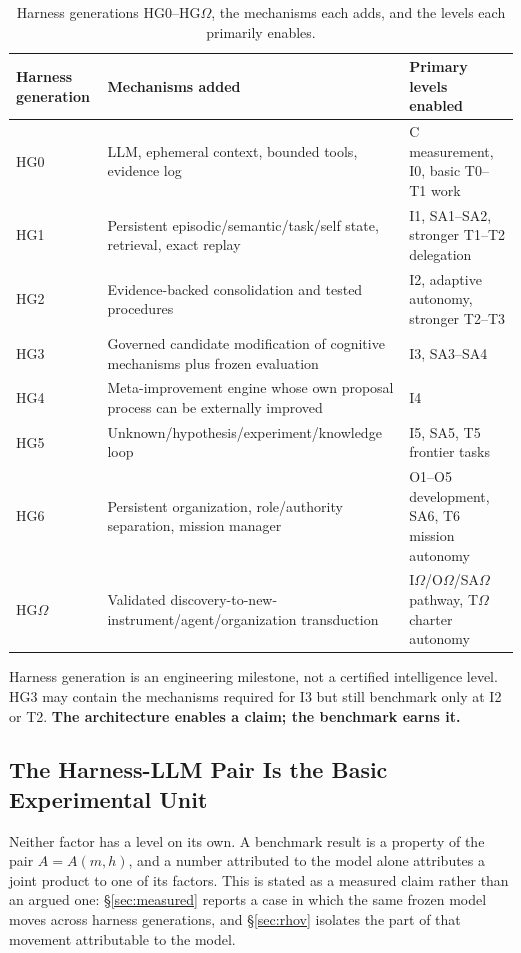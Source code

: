 \documentclass[11pt]{article}
\theoremstyle{definition}
\newcommand{\Om}{\ensuremath{\Omega}}
\begin{document}
\begin{table}[!htbp]
\centering\small
\begin{tabularx}{\textwidth}{@{}lYY@{}}
\toprule
Harness generation & Mechanisms added & Primary levels enabled \\
\midrule
HG0 & LLM, ephemeral context, bounded tools, evidence log & C measurement, I0, basic T0--T1 work \\
HG1 & Persistent episodic/semantic/task/self state, retrieval, exact replay & I1, SA1--SA2, stronger T1--T2 delegation \\
HG2 & Evidence-backed consolidation and tested procedures & I2, adaptive autonomy, stronger T2--T3 \\
HG3 & Governed candidate modification of cognitive mechanisms plus frozen evaluation & I3, SA3--SA4 \\
HG4 & Meta-improvement engine whose own proposal process can be externally improved & I4 \\
HG5 & Unknown/hypothesis/experiment/knowledge loop & I5, SA5, T5 frontier tasks \\
HG6 & Persistent organization, role/authority separation, mission manager & O1--O5 development, SA6, T6 mission autonomy \\
HG\Om{} & Validated discovery-to-new-instrument/agent/organization transduction & I\Om{}/O\Om{}/SA\Om{} pathway, T\Om{} charter autonomy \\
\bottomrule
\end{tabularx}
\caption{Harness generations HG0--HG\Om{}, the mechanisms each adds, and the levels each primarily enables.}
\label{tab:hg}
\end{table}

Harness generation is an engineering milestone, not a certified intelligence level. HG3 may contain the mechanisms required for I3 but still benchmark only at I2 or T2. \textbf{The architecture enables a claim; the benchmark earns it.}

\subsection{The Harness-LLM Pair Is the Basic Experimental Unit}\label{sec:pair}

Neither factor has a level on its own. A benchmark result is a property of the pair $A = A(m,h)$, and a number attributed to the model alone attributes a joint product to one of its factors. This is stated as a measured claim rather than an argued one: \S\ref{sec:measured} reports a case in which the same frozen model moves across harness generations, and \S\ref{sec:rhov} isolates the part of that movement attributable to the model.
\end{document}
